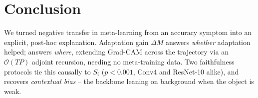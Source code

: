 \section{Conclusion}
\label{sec:conclusion}

We turned negative transfer in meta-learning from an accuracy symptom into an explicit, post-hoc explanation. Adaptation gain $\Delta M$ answers \emph{whether} adaptation helped; \fama answers \emph{where}, extending Grad-CAM across the trajectory via an $\mathcal{O}(TP)$ adjoint recursion, needing no meta-training data. Two faithfulness protocols tie this causally to $S_i$ ($p<0.001$, Conv4 and ResNet-10 alike), and \fama recovers \emph{contextual bias} -- the backbone leaning on background when the object is weak.
